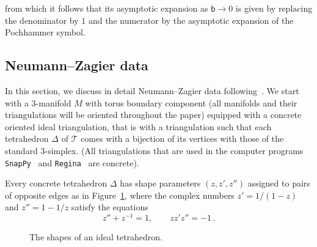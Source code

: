 \documentclass[12pt,reqno]{amsart}
\theoremstyle{definition}
\def\calT{\mathcal T}
\def\be{\begin{equation}}
\def\ee{\end{equation}}
\def\bb{\mathsf{b}}
\renewcommand{\=}{\;=\;}
\begin{document}
\noindent
from which it follows that its asymptotic expansion as $\bb \to 0$
is given by replacing the denominator by $1$ and the numerator by the
asymptotic expansion of the Pochhammer symbol.

\subsection{Neumann--Zagier data}
\label{sub.NZ}

In this section, we discuss in detail Neumann--Zagier data following~\cite{DG}.
We start with a 3-manifold $M$ with torus boundary component (all manifolds and their
triangulations will be oriented throughout the paper) equipped with
a concrete oriented ideal triangulation, that is with a triangulation such that
each tetrahedron $\Delta$ of $\calT$ comes with a bijection of its vertices with
those of the standard 3-simplex. (All triangulations that are used in the computer
programs \texttt{SnapPy}~\cite{snappy} and \texttt{Regina}~\cite{regina} are concrete).

Every concrete tetrahedron $\Delta$ has shape parameters $(z,z',z'')$ assigned to
pairs of opposite edges as in Figure~\ref{fig.tetshapes}, where the complex numbers
$z'=1/(1-z)$ and $z''=1-1/z$ satisfy the equations
\be
\label{3z}
z''+z^{-1}=1, \qquad z z' z'' =-1 \,.
\ee

\begin{figure}[htpb!]
\begin{center}  
  \caption{The shapes of an ideal tetrahedron.}
\label{fig.tetshapes}
\end{center}
\end{figure}
\end{document}
